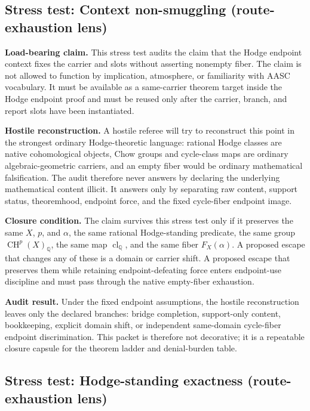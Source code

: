 \documentclass[11pt]{article}
\newcommand{\QQ}{\mathbb{Q}}
\newcommand{\CH}{\operatorname{CH}}
\newcommand{\clQ}{\operatorname{cl}_{\QQ}}
\begin{document}
\subsection{Stress test: Context non-smuggling (route-exhaustion lens)}

\par\noindent\textbf{Load-bearing claim.} This stress test audits the claim that the Hodge endpoint context fixes the carrier and slots without asserting nonempty fiber. The claim is not allowed to function by implication, atmosphere, or familiarity with AASC vocabulary. It must be available as a same-carrier theorem target inside the Hodge endpoint proof and must be reused only after the carrier, branch, and report slots have been instantiated.

\par\noindent\textbf{Hostile reconstruction.} A hostile referee will try to reconstruct this point in the strongest ordinary Hodge-theoretic language: rational Hodge classes are native cohomological objects, Chow groups and cycle-class maps are ordinary algebraic-geometric carriers, and an empty fiber would be ordinary mathematical falsification. The audit therefore never answers by declaring the underlying mathematical content illicit. It answers only by separating raw content, support status, theoremhood, endpoint force, and the fixed cycle-fiber endpoint image.

\par\noindent\textbf{Closure condition.} The claim survives this stress test only if it preserves the same $X$, $p$, and $\alpha$, the same rational Hodge-standing predicate, the same group $\CH^p(X)_\QQ$, the same map $\clQ$, and the same fiber $F_X(\alpha)$. A proposed escape that changes any of these is a domain or carrier shift. A proposed escape that preserves them while retaining endpoint-defeating force enters endpoint-use discipline and must pass through the native empty-fiber exhaustion.

\par\noindent\textbf{Audit result.} Under the fixed endpoint assumptions, the hostile reconstruction leaves only the declared branches: bridge completion, support-only content, bookkeeping, explicit domain shift, or independent same-domain cycle-fiber endpoint discrimination. This packet is therefore not decorative; it is a repeatable closure capsule for the theorem ladder and denial-burden table.


\subsection{Stress test: Hodge-standing exactness (route-exhaustion lens)}
\end{document}
